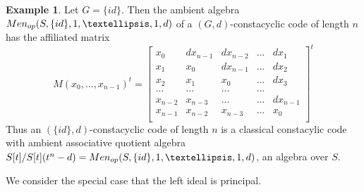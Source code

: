 \documentclass[11pt]{amsart}
\theoremstyle{plain}
\theoremstyle{definition}
\newtheorem{example}[theorem]{Example}
\begin{document}
 \begin{example}
 Let  $G=\{id\}$. Then the ambient  algebra ${\rm Men}_{op}(S, \{id\}, 1,\dots,1,d)$ of a $(G,d)$-constacyclic code of length $n$  has the affiliated matrix
  \[ M(x_0,\dots,x_{n-1})^t=\left [\begin {array}{ccccccc}
x_0 &  d x_{n-1} & d x_{n-2} &... & d x_{1}\\
x_1 & x_0 & d x_{n-1}&... &  d x_{2}\\
x_2 & x_{1} & x_0 & ... & d x_{3}\\
...& ...  & ... & ...\\
x_{n-2} &  x_{n-3}  & ...& ...& d x_{n-1}\\
x_{n-1} &  x_{n-2} &    x_{n-3}  & ...& x_{0}\\
\end {array}\right ]^t
 \]
  Thus an $(\{id\},d)$-constacyclic code of length $n$ is a classical constacylic code  with ambient associative quotient algebra $S[t]/S[t](t^n-d)={\rm Men}_{op}(S, \{id\}, 1,\dots,1,d)$, an algebra over $S$.
\end{example}

We  consider the special case that the left ideal is principal.
\end{document}
